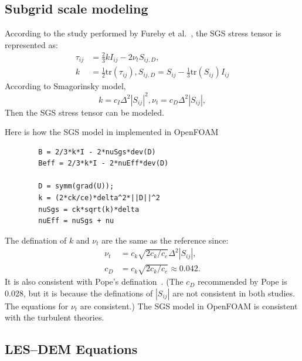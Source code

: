 \documentclass[11pt]{article}
\begin{document}
\subsection{Subgrid scale modeling}

According to the study performed by Fureby et al.~\cite{fureby97ac}, the SGS stress
  tensor is represented as:
  \begin{equation}
  \begin{split}
    \tau_{ij} & = \frac{2}{3}kI_{ij}-2\nu_tS_{ij,D},\\
    k & = \frac{1}{2}\mathrm{tr}(\tau_{ij}), 
    S_{ij,D}=S_{ij}-\frac{1}{3}\mathrm{tr}(S_{ij})I_{ij}
  \label{eqn:tau_sgs}
  \end{split}
  \end{equation}
  According to Smagorinsky model,
  \begin{equation}
    k=c_I\Delta^2|S_{ij}|^2, \nu_t=c_D\Delta^2|S_{ij}|,
  \label{eqn:sma-tau}
  \end{equation}
  Then the SGS stress tensor can be modeled.

  Here is how the SGS model in implemented in OpenFOAM
    \begin{lstlisting}
        B = 2/3*k*I - 2*nuSgs*dev(D)
        Beff = 2/3*k*I - 2*nuEff*dev(D)

        D = symm(grad(U));
        k = (2*ck/ce)*delta^2*||D||^2
        nuSgs = ck*sqrt(k)*delta
        nuEff = nuSgs + nu
    \end{lstlisting}
  The defination of $k$ and $\nu_t$ are the same as the reference since:
    \begin{equation}
        \begin{split}
        \nu_t &= c_k\sqrt{2c_k/c_e}\Delta^2|S_{ij}|,\\
        c_D &= c_k\sqrt{2c_k/c_e} \approx 0.042.
        \end{split}
    \label{eqn:sma-eqav}
    \end{equation}
  It is also consistent with Pope's defination~\cite{pope00tf}. (The $c_D$ recommended by Pope is
  0.028, but it is because the definations of $|S_{ij}|$ are not consistent in both studies. The
  equations for $\nu_t$ are consistent.) The SGS model in OpenFOAM is consistent with the turbulent
  theories.

\subsection{LES--DEM Equations}
\end{document}
